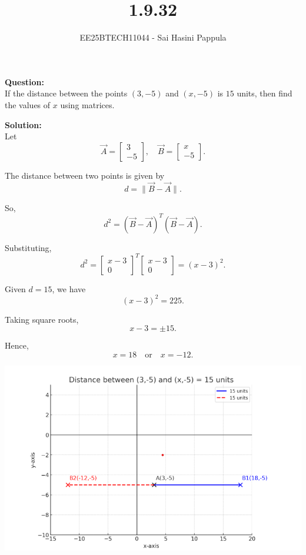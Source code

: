 \documentclass[journal]{IEEEtran}
\begin{document}

\vspace{3cm}

\title{1.9.32}
\author{EE25BTECH11044 - Sai Hasini Pappula}
 \maketitle
{\let\newpage\relax\maketitle}

\renewcommand{\thefigure}{\theenumi}
\renewcommand{\thetable}{\theenumi}
\setlength{\intextsep}{10pt} %


\renewcommand{\thetable}{\theenumi}

\textbf{Question:}\\
If the distance between the points $(3,-5)$ and $(x,-5)$ is $15$ units, then find the values of $x$ using matrices.

\bigskip

\textbf{Solution:}\\
Let 
\[
\vec{A} = \begin{bmatrix} 3 \\ -5 \end{bmatrix}, 
\quad 
\vec{B} = \begin{bmatrix} x \\ -5 \end{bmatrix}.
\]

The distance between two points is given by
\[
d = \|\vec{B}-\vec{A}\|.
\]

So,
\[
d^2 = (\vec{B}-\vec{A})^{T}(\vec{B}-\vec{A}).
\]

Substituting,
\[
d^2 = 
\begin{bmatrix} x-3 \\ 0 \end{bmatrix}^{T}
\begin{bmatrix} x-3 \\ 0 \end{bmatrix}
= (x-3)^2.
\]

Given $d = 15$, we have
\[
(x-3)^2 = 225.
\]

Taking square roots,
\[
x-3 = \pm 15.
\]

Hence,
\[
x = 18 \quad \text{or} \quad x = -12.
\]

\begin{center}
    \includegraphics[width=0.6\columnwidth]{figs/plot2.png}
\end{center}
\end{document}
